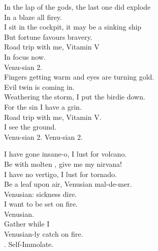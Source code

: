 


In the lap of the gods, the last one did explode \\
In a blaze all firey. \\
I sit in the cockpit, it may be a sinking ship \\
But fortune favours bravery. \\

Road trip with me, Vitamin V \\
In focus now. \\

Venu-sian 2. \\

Fingers getting warm and eyes are turning gold. \\
Evil twin is coming in. \\
Weathering the storm, I put the birdie down. \\
For the sin I have a grin. \\

Road trip with me, Vitamin V. \\
I see the ground. \\

Venu-sian 2. Venu-sian 2. \\





I have gone insane-o, I lust for volcano. \\
Be with molten , give me my nirvana! \\
I have no vertigo, I lust for tornado. \\
Be a leaf upon air, Venusian mal-de-mer. \\

Venusian: sickness dire. \\
I want to be set on fire. \\
Venusian. \\
Gather while I \\
Venusian-ly catch on fire. \\

. Self-Immolate. \\

